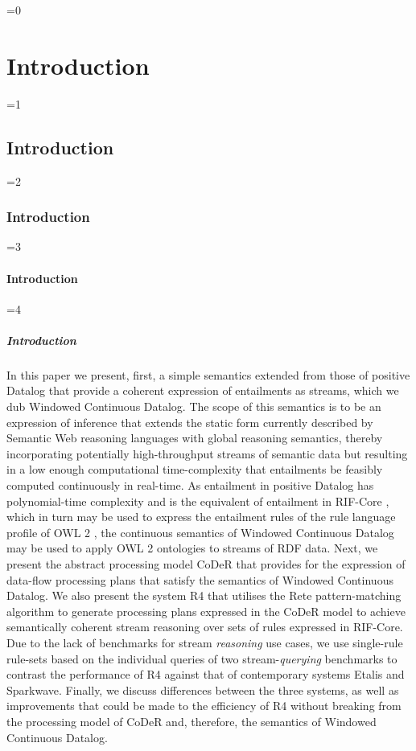 \documentclass[twocolumn,preprint,3p,number]{elsarticle}
\theoremstyle{plain}
\theoremstyle{definition}
\newcounter{nestingdepth}
\newenvironment{nestedsection}[2]{
  \ifnum\value{nestingdepth}=0
    \chapter{#1}
  \else
    \ifnum\value{nestingdepth}=1
      \section{#1}
    \else
      \ifnum\value{nestingdepth}=2
        \subsection{#1}
      \else
        \ifnum\value{nestingdepth}=3
          \subsubsection{#1}
        \else
          \ifnum\value{nestingdepth}=4
            \paragraph{#1}
          \else
            \PackageError{nestedsections}{Maximum nesting level exceeded!}{uh oh!}
          \fi
        \fi
      \fi
    \fi
  \fi
  \addtocounter{nestingdepth}{1}
  \label{sec:#2}
}{\addtocounter{nestingdepth}{-1}}
\begin{document}
\begin{nestedsection}{Introduction}{intro}
  In this paper we present, first, a simple semantics extended from those of positive Datalog that provide a coherent expression of entailments as streams, which we dub Windowed Continuous Datalog.
  The scope of this semantics is to be an expression of inference that extends the static form currently described by Semantic Web reasoning languages with global reasoning semantics, thereby incorporating potentially high-throughput streams of semantic data but resulting in a low enough computational time-complexity that entailments be feasibly computed continuously in real-time.
  As entailment in positive Datalog has polynomial-time complexity and is the equivalent of entailment in RIF-Core \citep{w3crifcore}, which in turn may be used to express the entailment rules of the rule language profile of OWL 2 \citep{w3cowl2profiles}, the continuous semantics of Windowed Continuous Datalog may be used to apply OWL 2 ontologies to streams of RDF data.
  Next, we present the abstract processing model CoDeR that provides for the expression of data-flow processing plans that satisfy the semantics of Windowed Continuous Datalog.
  We also present the system R4 that utilises the Rete pattern-matching algorithm to generate processing plans expressed in the CoDeR model to achieve semantically coherent stream reasoning over sets of rules expressed in RIF-Core.
  Due to the lack of benchmarks for stream \emph{reasoning} use cases, we use single-rule rule-sets based on the individual queries of two stream-\emph{querying} benchmarks to contrast the performance of R4 against that of contemporary systems Etalis and Sparkwave.
  Finally, we discuss differences between the three systems, as well as improvements that could be made to the efficiency of R4 without breaking from the processing model of CoDeR and, therefore, the semantics of Windowed Continuous Datalog.
\end{nestedsection}
\end{document}
